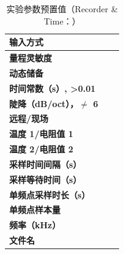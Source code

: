 \begin{table}[h!]
	\centering
	\caption{实验参数预置值（Recorder \& Time：\hspace{4cm}）}
	\label{tab:data4}
	\begin{tabular}{|p{4cm}|p{4cm}|p{4cm}|}
		\hline
		\textbf{输入方式} &  & \\ \hline
		\textbf{量程灵敏度} &  & \\ \hline
		\textbf{动态储备} &  & \\ \hline
		\textbf{时间常数（s）, >0.01} & & \\ \hline
		\textbf{陡降（dB/oct），$\neq$ 6} & & \\ \hline
		\textbf{远程/现场} & & \\ \hline
		\textbf{温度 1/电阻值 1} & & \\ \hline
		\textbf{温度 2/电阻值 2} & & \\ \hline
		\textbf{采样时间间隔（s）} & & \\ \hline
		\textbf{采样等待时间（s）} & & \\ \hline
		\textbf{单频点采样时长（s）} & & \\ \hline
		\textbf{单频点样本量} &  & \\ \hline
		\textbf{频率（kHz）} & & \\ \hline
		\textbf{文件名} & & \\ \hline
	\end{tabular}
\end{table}

%
%


